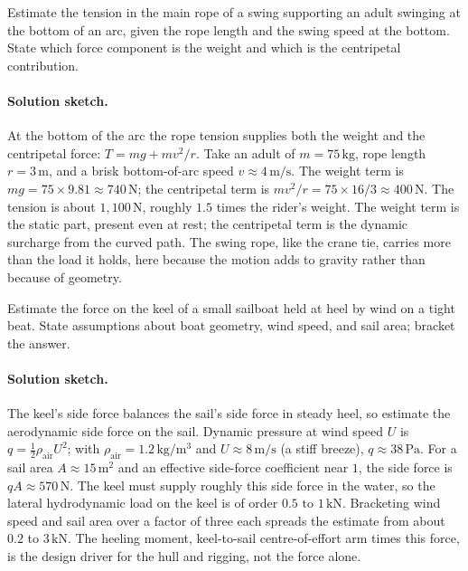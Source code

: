 \begin{exercise}
Estimate the tension in the main rope of a swing supporting an adult
swinging at the bottom of an arc, given the rope length and the
swing speed at the bottom. State which force component is the
weight and which is the centripetal contribution.

\paragraph{Solution sketch.} At the bottom of the arc the rope tension
supplies both the weight and the centripetal force: $T = mg + m v^2 / r$.
Take an adult of $m = 75\,\si{\kilogram}$, rope length $r = 3\,\si{
\meter}$, and a brisk bottom-of-arc speed $v \approx 4\,\si{\meter\per
\second}$. The weight term is $mg = 75 \times 9.81 \approx 740\,\text{N}$;
the centripetal term is $m v^2 / r = 75 \times 16 / 3 \approx 400\,
\text{N}$. The tension is about $1{,}100\,\text{N}$, roughly $1.5$ times
the rider's weight. The weight term is the static part, present even at
rest; the centripetal term is the dynamic surcharge from the curved
path. The swing rope, like the crane tie, carries more than the load it
holds, here because the motion adds to gravity rather than because of
geometry.
\end{exercise}

\begin{exercise}
Estimate the force on the keel of a small sailboat held at heel
by wind on a tight beat. State assumptions about boat geometry,
wind speed, and sail area; bracket the answer.

\paragraph{Solution sketch.} The keel's side force balances the sail's
side force in steady heel, so estimate the aerodynamic side force on the
sail. Dynamic pressure at wind speed $U$ is $q = \tfrac12 \rho_{\text{air}}
U^2$; with $\rho_{\text{air}} = 1.2\,\si{\kilogram\per\meter\cubed}$ and
$U \approx 8\,\si{\meter\per\second}$ (a stiff breeze), $q \approx 38\,
\text{Pa}$. For a sail area $A \approx 15\,\si{\meter\squared}$ and an
effective side-force coefficient near $1$, the side force is $q A
\approx 570\,\text{N}$. The keel must supply roughly this side force in
the water, so the lateral hydrodynamic load on the keel is of order
$0.5\text{ to }1\,\text{kN}$. Bracketing wind speed and sail area over a
factor of three each spreads the estimate from about $0.2$ to
$3\,\text{kN}$. The heeling moment, keel-to-sail centre-of-effort arm
times this force, is the design driver for the hull and rigging, not the
force alone.
\end{exercise}

